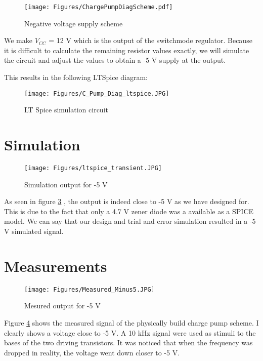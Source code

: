 \begin{figure}[h]
    \centering
    \texttt{[image: Figures/ChargePumpDiagScheme.pdf]}
    \caption{Negative voltage supply scheme}
    \label{fig:C_pump_theorydiag}
\end{figure}

We make $V_{CC}$ = 12 V which is the output of the switchmode regulator. Because it is difficult to calculate the remaining resistor values exactly, we will simulate the circuit and adjust the values to obtain a -5 V supply at the output.

This results in the following LTSpice diagram:

\begin{figure}[h]
    \centering
    \texttt{[image: Figures/C\_Pump\_Diag\_ltspice.JPG]}
    \caption{LT Spice simulation circuit}
    \label{fig:LTSpice-5V}
\end{figure}

\section{Simulation} \label{sec:simulation_chargepump}

\begin{figure}[h]
    \centering
    \texttt{[image: Figures/ltspice\_transient.JPG]}
    \caption{Simulation output for -5 V}
    \label{fig:-5V output}
\end{figure}

As seen in figure \ref{fig:-5V output} , the output is indeed close to -5 V as we have designed for. This is due to the fact that only a 4.7 V zener diode was a available as a SPICE model. We can say that our design and trial and error simulation resulted in a -5 V simulated signal.

\section{Measurements} \label{sec:measurements_chargepump}

\begin{figure}[h]
    \centering
    \texttt{[image: Figures/Measured\_Minus5.JPG]}
    \caption{Mesured output for -5 V}
    \label{fig:-5V output measured}
\end{figure}

Figure \ref{fig:-5V output measured}  shows the measured signal of the physically build charge pump scheme. I clearly shows a voltage close to -5 V. A 10 kHz signal were used as stimuli to the bases of the two driving transistors. It was noticed that when the frequency was dropped in reality, the voltage went down closer to -5 V. 






